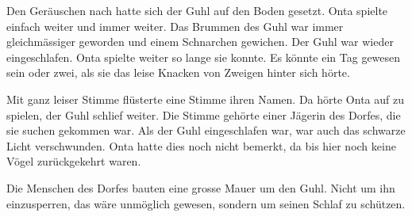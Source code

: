 Den Geräuschen nach hatte sich der Guhl auf den Boden gesetzt. Onta spielte einfach weiter und immer weiter. Das Brummen des Guhl war immer gleichmässiger geworden und einem Schnarchen gewichen. Der Guhl war wieder eingeschlafen. Onta spielte weiter so lange sie konnte. Es könnte ein Tag gewesen sein oder zwei, als sie das leise Knacken von Zweigen hinter sich hörte.

Mit ganz leiser Stimme flüsterte eine Stimme ihren Namen. Da hörte Onta auf zu spielen, der Guhl schlief weiter. Die Stimme gehörte einer Jägerin des Dorfes, die sie suchen gekommen war. Als der Guhl eingeschlafen war, war auch das schwarze Licht verschwunden. Onta hatte dies noch nicht bemerkt, da bis hier noch keine Vögel zurückgekehrt waren.

Die Menschen des Dorfes bauten eine grosse Mauer um den Guhl. Nicht um ihn einzusperren, das wäre unmöglich gewesen, sondern um seinen Schlaf zu schützen.  \hfill {\color{red}\decofourleft}
